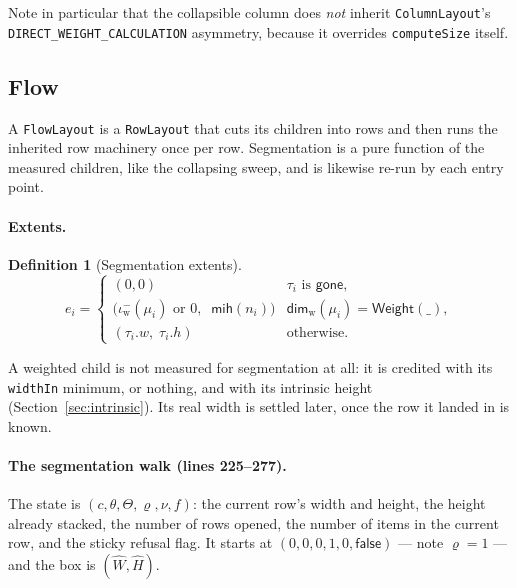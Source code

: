 \documentclass[11pt,a4paper]{article}
\newcommand{\Weight}{\mathsf{Weight}}
\newcommand{\mih}{\mathsf{mih}}
\newcommand{\gone}{\mathsf{gone}}
\newcommand{\Iw}{\iota_{\mathrm{w}}}
\newcommand{\Dimw}{\mathsf{dim}_{\mathrm{w}}}
\newcommand{\jv}[1]{\texttt{#1}}       %
\theoremstyle{definition}
\newtheorem{definition}{Definition}[section]
\theoremstyle{plain}
\theoremstyle{remark}
\begin{document}
Note in particular that the collapsible column does \emph{not} inherit
\jv{ColumnLayout}'s \jv{DIRECT\_WEIGHT\_CALCULATION} asymmetry, because it
overrides \jv{computeSize} itself.

\subsection{Flow}
\label{sec:flow}

A \jv{FlowLayout} is a \jv{RowLayout} that cuts its children into rows and then
runs the inherited row machinery once per row. Segmentation is a pure function
of the measured children, like the collapsing sweep, and is likewise re-run by
each entry point.

\paragraph{Extents.}

\begin{definition}[Segmentation extents]
\[
  e_i = \begin{cases}
    (0, 0) & \tau_i \text{ is } \gone, \\
    \bigl(\Iw^-(\mu_i) \text{ or } 0,\;\; \mih(n_i)\bigr)
      & \Dimw(\mu_i) = \Weight(\_), \\
    (\tau_i.w,\; \tau_i.h) & \text{otherwise.}
  \end{cases}
\]
\end{definition}

A weighted child is not measured for segmentation at all: it is credited with its
\jv{widthIn} minimum, or nothing, and with its intrinsic height
(Section~\ref{sec:intrinsic}). Its real width is settled later, once the row it
landed in is known.

\paragraph{The segmentation walk (lines 225--277).}
The state is $(c, \theta, \Theta, \varrho, \nu, f)$: the current row's width and
height, the height already stacked, the number of rows opened, the number of
items in the current row, and the sticky refusal flag. It starts at
$(0, 0, 0, 1, 0, \textsf{false})$ --- note $\varrho = 1$ --- and the box is
$(\hat W, \hat H)$.
\end{document}
